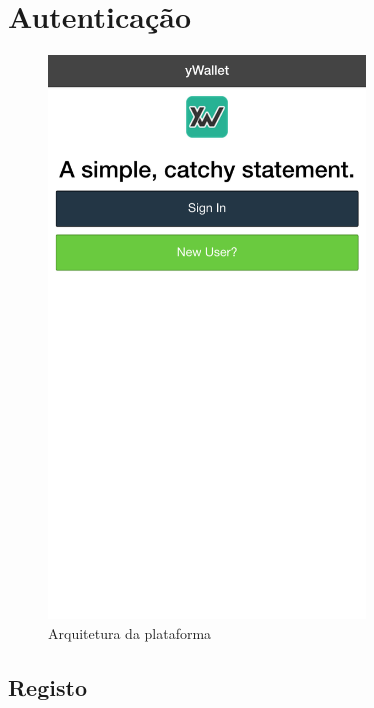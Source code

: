 \documentclass{article}
\begin{document}


\tableofcontents

\pagebreak

\section{Autenticação}

  \begin{figure}[H]
    \begin{center}
      \includegraphics[width=0.75\textwidth]{authentication/init.png}
    \end{center}
    \caption{Arquitetura da plataforma}
    \label{fig:arq_app}
  \end{figure}

  \subsection{Registo}
\end{document}
